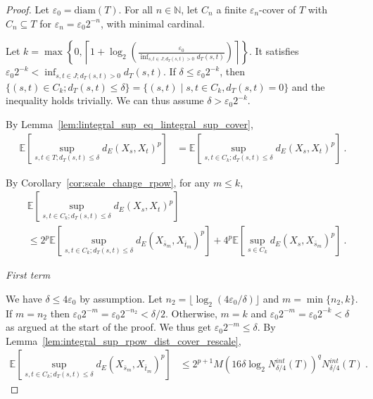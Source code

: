 \begin{proof}
Let $\varepsilon_0 = \mathrm{diam}(T)$.
For all $n \in \mathbb{N}$, let $C_n$ a finite $\varepsilon_n$-cover of $T$ with $C_n \subseteq T$ for $\varepsilon_n = \varepsilon_0 2^{-n}$, with minimal cardinal.

Let $k = \max \left\{ 0, \left\lceil 1 + \log_2\left(\frac{\varepsilon_0}{\inf_{s, t \in J; d_T(s,t)>0}d_T(s, t)}\right) \right\rceil \right\}$.
It satisfies $\varepsilon_0 2^{-k} < \inf_{s, t \in J; d_T(s,t)>0}d_T(s, t)$.
If $\delta \le \varepsilon_0 2^{-k}$, then $\{(s, t) \in C_k; d_T(s, t) \le \delta\} = \{(s, t) \mid s,t \in C_k, d_T(s,t) = 0\}$ and the inequality holds trivially.
We can thus assume $\delta > \varepsilon_0 2^{-k}$.

By Lemma~\ref{lem:lintegral_sup_eq_lintegral_sup_cover},
\begin{align*}
  \mathbb{E}\left[ \sup_{s, t \in T; d_T(s, t) \le \delta} d_E(X_s, X_t)^p \right]
  &= \mathbb{E}\left[ \sup_{s, t \in C_k; d_T(s, t) \le \delta} d_E(X_s, X_t)^p \right]
  \: .
\end{align*}

By Corollary~\ref{cor:scale_change_rpow}, for any $m \le k$,
\begin{align*}
  &\mathbb{E}\left[ \sup_{s, t \in C_k; d_T(s, t) \le \delta} d_E(X_s, X_t)^p \right]
  \\
  &\le 2^p \mathbb{E}\left[ \sup_{s, t \in C_k; d_T(s, t) \le \delta} d_E(X_{\bar{s}_m}, X_{\bar{t}_m})^p \right]
    + 4^p \mathbb{E}\left[ \sup_{s \in C_k} d_E(X_s, X_{\bar{s}_m})^p \right]
  \: .
\end{align*}

\emph{First term}

We have $\delta \le 4\varepsilon_0$ by assumption.
Let $n_2 = \lfloor \log_2(4\varepsilon_0/\delta) \rfloor$ and $m = \min\{n_2, k\}$.
If $m = n_2$ then $\varepsilon_0 2^{-m} = \varepsilon_0 2^{-n_2} < \delta/2$.
Otherwise, $m = k$ and $\varepsilon_0 2^{-m} = \varepsilon_0 2^{-k} < \delta$ as argued at the start of the proof.
We thus get $\varepsilon_0 2^{-m} \le \delta$.
By Lemma~\ref{lem:integral_sup_rpow_dist_cover_rescale},
\begin{align*}
  \mathbb{E} \left[ \sup_{s, t \in C_k; d_T(s, t) \le \delta} d_E(X_{\bar{s}_m}, X_{\bar{t}_m})^p \right]
  &\le 2^{p+1} M \left(16 \delta \log_2 N^{int}_{\delta/4}(T) \right)^q  N^{int}_{\delta/4}(T)
  \: .
\end{align*}


\end{proof}
